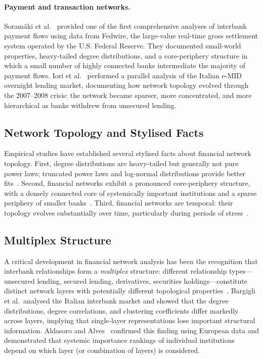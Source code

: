 \paragraph{Payment and transaction networks.}
Soram\"aki et al.~\cite{soramaki2007topology} provided one of the first
comprehensive analyses of interbank payment flows using data from
Fedwire, the large-value real-time gross settlement system operated by
the U.S. Federal Reserve.  They documented small-world properties,
heavy-tailed degree distributions, and a core-periphery structure in
which a small number of highly connected banks intermediate the majority
of payment flows.  Iori et al.~\cite{iori2008network} performed a
parallel analysis of the Italian e-MID overnight lending market,
documenting how network topology evolved through the 2007--2008 crisis:
the network became sparser, more concentrated, and more hierarchical as
banks withdrew from unsecured lending.

\subsection{Network Topology and Stylised Facts}
\label{sec:topology}

Empirical studies have established several stylised facts about financial
network topology.  First, degree distributions are heavy-tailed but
generally not pure power laws; truncated power laws and log-normal
distributions provide better fits~\cite{soramaki2007topology}.  Second,
financial networks exhibit a pronounced core-periphery structure, with a
densely connected core of systemically important institutions and a
sparse periphery of smaller banks~\cite{newman2003structure}.  Third,
financial networks are temporal: their topology evolves substantially
over time, particularly during periods of
stress~\cite{iori2008network,holme2012temporal}.

\subsection{Multiplex Structure}
\label{sec:multiplex}

A critical development in financial network analysis has been the
recognition that interbank relationships form a \emph{multiplex}
structure: different relationship types---unsecured lending, secured
lending, derivatives, securities holdings---constitute distinct network
layers with potentially different topological
properties~\cite{bargigli2015multiplex}.  Bargigli et al.\ analysed the
Italian interbank market and showed that the degree distributions, degree
correlations, and clustering coefficients differ markedly across layers,
implying that single-layer representations lose important structural
information.  Aldasoro and Alves~\cite{aldasoro2018multiplex} confirmed
this finding using European data and demonstrated that systemic
importance rankings of individual institutions depend on which layer (or
combination of layers) is considered.

